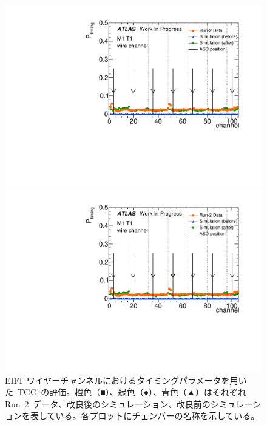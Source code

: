 \begin{figure}[htbp]
\begin{minipage}{0.49\hsize}
			\includegraphics[width=\textwidth,page=40]{img/pdf5/master_timingplot_comp.pdf}
			\end{minipage}
			\begin{minipage}{0.49\hsize}
			\centering
			\includegraphics[width=\textwidth,page=42]{img/pdf5/master_timingplot_comp.pdf}
			\end{minipage}
		\caption[EIFI~ワイヤーチャンネルにおけるタイミングパラメータを用いた~TGC~の評価。]{EIFI~ワイヤーチャンネルにおけるタイミングパラメータを用いた~TGC~の評価。橙色（■）、緑色（●）、青色（▲）はそれぞれRun~2~データ、改良後のシミュレーション、改良前のシミュレーションを表している。各プロットにチェンバーの名称を示している。}
		\label{fig:timingPlotCompWireEIFI}
	\end{figure}
    
